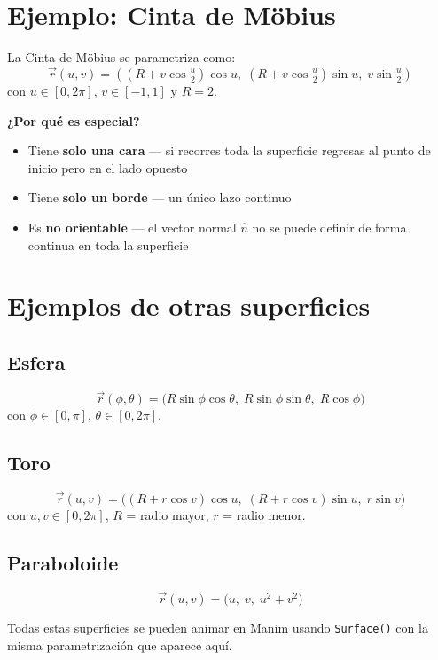 \documentclass[12pt]{article}
\begin{document}
\section{Ejemplo: Cinta de Möbius}

\begin{ejemplo}
La Cinta de Möbius se parametriza como:
\[
  \vec{r}(u,v) = \left(
    \left(R + v\cos\tfrac{u}{2}\right)\cos u,\;
    \left(R + v\cos\tfrac{u}{2}\right)\sin u,\;
    v\sin\tfrac{u}{2}
  \right)
\]
con $u \in [0, 2\pi]$, $v \in [-1, 1]$ y $R = 2$.

\medskip
\textbf{¿Por qué es especial?}
\begin{itemize}
  \item Tiene \textcolor{rojoSuper}{\textbf{solo una cara}} — si recorres 
        toda la superficie regresas al punto de inicio pero 
        en el lado opuesto
  \item Tiene \textcolor{rojoSuper}{\textbf{solo un borde}} — un único 
        lazo continuo
  \item Es \textcolor{azulIPn}{\textbf{no orientable}} — el vector normal 
        $\hat{n}$ no se puede definir de forma continua en toda la superficie
\end{itemize}
\end{ejemplo}

\section{Ejemplos de otras superficies}

\subsection{Esfera}
\[
  \vec{r}(\phi, \theta) = 
  \bigl(R\sin\phi\cos\theta,\; R\sin\phi\sin\theta,\; R\cos\phi\bigr)
\]
con $\phi \in [0,\pi]$, $\theta \in [0, 2\pi]$.

\subsection{Toro}
\[
  \vec{r}(u,v) = 
  \bigl((R + r\cos v)\cos u,\; (R + r\cos v)\sin u,\; r\sin v\bigr)
\]
con $u, v \in [0, 2\pi]$, $R$ = radio mayor, $r$ = radio menor.

\subsection{Paraboloide}
\[
  \vec{r}(u,v) = \bigl(u,\; v,\; u^2 + v^2\bigr)
\]

\bigskip
\begin{nota}
  Todas estas superficies se pueden animar en Manim usando \texttt{Surface()} 
  con la misma parametrización que aparece aquí.
\end{nota}
\end{document}
